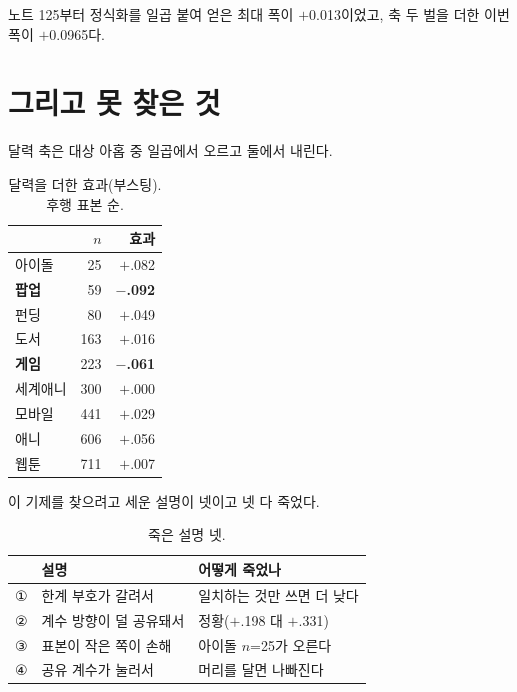 \documentclass[10pt]{article}
\begin{document}
노트 125부터 정식화를 일곱 붙여 얻은 최대 폭이 $+$0.013이었고, 축 두 벌을
더한 이번 폭이 $+$0.0965다.

\section{그리고 못 찾은 것}

달력 축은 대상 아홉 중 일곱에서 오르고 둘에서 내린다.

\begin{table}[t]
\centering\tsize
\caption{달력을 더한 효과(부스팅). 후행 표본 순.}
\begin{tabular}{lrr}
\toprule
& $n$ & 효과 \\
\midrule
아이돌 & 25 & $+$.082 \\
\textbf{팝업} & 59 & \textbf{$-$.092} \\
펀딩 & 80 & $+$.049 \\
도서 & 163 & $+$.016 \\
\textbf{게임} & 223 & \textbf{$-$.061} \\
세계애니 & 300 & $+$.000 \\
모바일 & 441 & $+$.029 \\
애니 & 606 & $+$.056 \\
웹툰 & 711 & $+$.007 \\
\bottomrule
\end{tabular}
\end{table}


이 기제를 찾으려고 세운 설명이 넷이고 넷 다 죽었다.

\begin{table}[t]
\centering\tsize
\caption{죽은 설명 넷.}
\begin{tabular}{lll}
\toprule
& 설명 & 어떻게 죽었나 \\
\midrule
① & 한계 부호가 갈려서 & 일치하는 것만 쓰면 더 낮다 \\
② & 계수 방향이 덜 공유돼서 & 정황($+$.198 대 $+$.331) \\
③ & 표본이 작은 쪽이 손해 & 아이돌 $n$=25가 오른다 \\
④ & 공유 계수가 눌러서 & 머리를 달면 나빠진다 \\
\bottomrule
\end{tabular}
\end{table}
\end{document}
